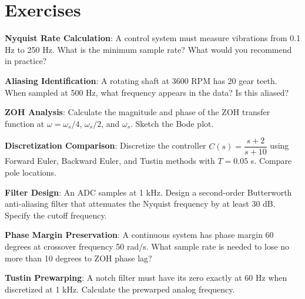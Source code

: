 \newpage
\section{Exercises}
\label{sec:exercises}

\begin{exercise}
\textbf{Nyquist Rate Calculation}: A control system must measure vibrations from 0.1 Hz to 250 Hz. What is the minimum sample rate? What would you recommend in practice?
\end{exercise}

\begin{exercise}
\textbf{Aliasing Identification}: A rotating shaft at 3600 RPM has 20 gear teeth. When sampled at 500 Hz, what frequency appears in the data? Is this aliased?
\end{exercise}

\begin{exercise}
\textbf{ZOH Analysis}: Calculate the magnitude and phase of the ZOH transfer function at $\omega = \omega_s/4$, $\omega_s/2$, and $\omega_s$. Sketch the Bode plot.
\end{exercise}

\begin{exercise}
\textbf{Discretization Comparison}: Discretize the controller $C(s) = \dfrac{s + 2}{s + 10}$ using Forward Euler, Backward Euler, and Tustin methods with $T = 0.05$ s. Compare pole locations.
\end{exercise}

\begin{exercise}
\textbf{Filter Design}: An ADC samples at 1 kHz. Design a second-order Butterworth anti-aliasing filter that attenuates the Nyquist frequency by at least 30 dB. Specify the cutoff frequency.
\end{exercise}

\begin{exercise}
\textbf{Phase Margin Preservation}: A continuous system has phase margin 60 degrees at crossover frequency 50 rad/s. What sample rate is needed to lose no more than 10 degrees to ZOH phase lag?
\end{exercise}

\begin{exercise}
\textbf{Tustin Prewarping}: A notch filter must have its zero exactly at 60 Hz when discretized at 1 kHz. Calculate the prewarped analog frequency.
\end{exercise}

